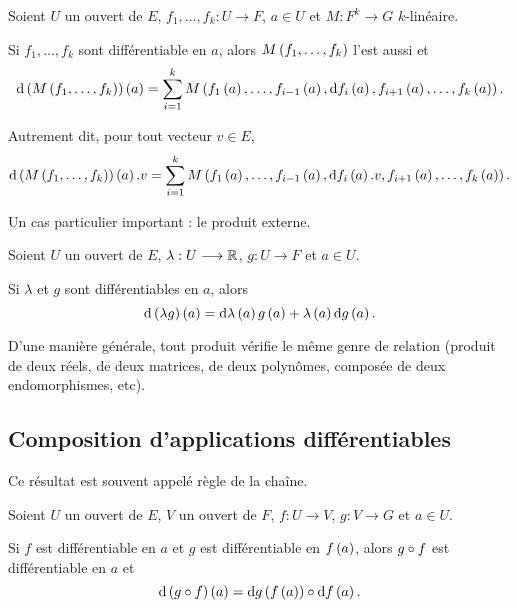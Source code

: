 \begin{prop}
Soient \(U\) un ouvert de \(E\), \(f_1,\dots,f_k:U\to F\), \(a\in U\) et \(M:F^k\to G\) \(k\)-linéaire.

Si \(f_1,\dots,f_k\) sont différentiable en \(a\), alors \(M\left(f_1,\dots,f_k\right)\) l'est aussi et \[\odif{\paren{M\paren{f_1,\dots,f_k}}}\paren{a}=\sum_{i=1}^kM\paren{f_1\paren{a},\dots,f_{i-1}\paren{a},\odif{f_i}\paren{a},f_{i+1}\paren{a},\dots,f_k\paren{a}}.\]
\end{prop}

Autrement dit, pour tout vecteur \(v\in E\), \[\odif{\paren{M\paren{f_1,\dots,f_k}}}\paren{a}.v=\sum_{i=1}^kM\paren{f_1\paren{a},\dots,f_{i-1}\paren{a},\odif{f_i}\paren{a}.v,f_{i+1}\paren{a},\dots,f_k\paren{a}}.\]

Un cas particulier important : le produit externe.

\begin{prop}
Soient \(U\) un ouvert de \(E\), \(\lambda:U\longrightarrow\mathbb{R}\), \(g:U\to F\) et \(a\in U\).

Si \(\lambda\) et \(g\) sont différentiables en \(a\), alors \[\odif{\paren{\lambda g}}\paren{a}=\odif{\lambda}\paren{a}g\paren{a}+\lambda\paren{a}\odif{g}\paren{a}.\]
\end{prop}

D'une manière générale, tout produit vérifie le même genre de relation (produit de deux réels, de deux matrices, de deux polynômes, composée de deux endomorphismes, etc).

\subsection{Composition d'applications différentiables}

Ce résultat est souvent appelé règle de la chaîne.

\begin{prop}
Soient \(U\) un ouvert de \(E\), \(V\) un ouvert de \(F\), \(f:U\to V\), \(g:V\to G\) et \(a\in U\).

Si \(f\) est différentiable en \(a\) et \(g\) est différentiable en \(f\left(a\right)\), alors \(g\circ f\) est différentiable en \(a\) et \[\odif{\paren{g\rond f}}\paren{a}=\odif{g}\paren{f\paren{a}}\rond\odif{f}\paren{a}.\]
\end{prop}


